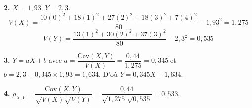 \documentclass[11pt]{article}
\begin{document}
\textbf{2.} $\overline{X} = 1{,}93$, $\overline{Y} = 2{,}3$.
\[ V(X) = \frac{10(0)^2 + 18(1)^2 + 27(2)^2 + 18(3)^2 + 7(4)^2}{80} - 1{,}93^2 = 1{,}275 \]
\[ V(Y) = \frac{13(1)^2 + 30(2)^2 + 37(3)^2}{80} - 2{,}3^2 = 0{,}535 \]

\textbf{3.} $Y = aX + b$ avec $a = \dfrac{\mathrm{Cov}(X,Y)}{V(X)} = \dfrac{0{,}44}{1{,}275} = 0{,}345$ et $b = 2{,}3 - 0{,}345\times 1{,}93 = 1{,}634$. D'où $Y = 0{,}345X + 1{,}634$.

\textbf{4.} $\rho_{X,Y} = \dfrac{\mathrm{Cov}(X,Y)}{\sqrt{V(X)}\sqrt{V(Y)}} = \dfrac{0{,}44}{\sqrt{1{,}275}\,\sqrt{0{,}535}} = 0{,}533$.
\end{document}
